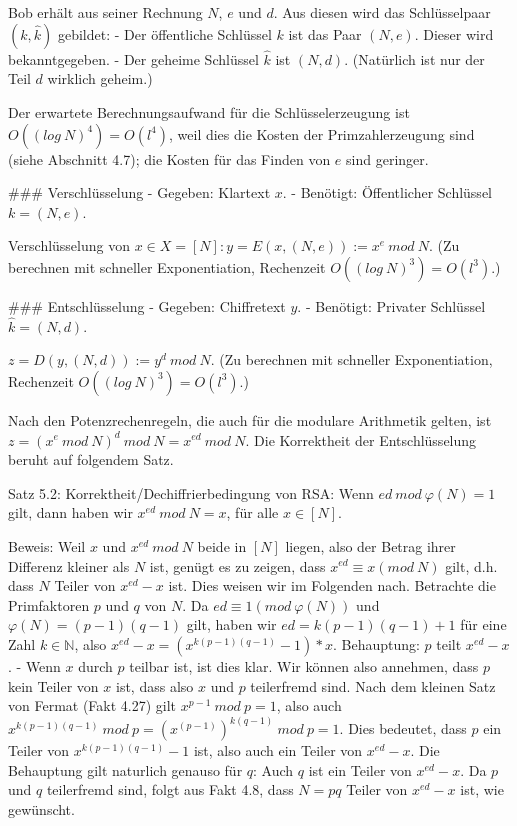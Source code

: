 \documentclass[a4paper]{article}
\begin{document}
\begin{multicols}{3}
{{{Bob erhält aus seiner Rechnung $N$, $e$ und $d$. Aus diesen wird das Schlüsselpaar $(k,\hat{k})$ gebildet:
- Der öffentliche Schlüssel $k$ ist das Paar $(N,e)$. Dieser wird bekanntgegeben.
- Der geheime Schlüssel $\hat{k}$ ist $(N,d)$. (Natürlich ist nur der Teil $d$ wirklich geheim.)

Der erwartete Berechnungsaufwand für die Schlüsselerzeugung ist $O((log\ N)^4) =O(l^4)$, weil dies die Kosten der Primzahlerzeugung sind (siehe Abschnitt 4.7); die Kosten für das Finden von $e$ sind geringer.

### Verschlüsselung
- Gegeben: Klartext $x$. 
- Benötigt: Öffentlicher Schlüssel $k= (N,e)$.

Verschlüsselung von $x\in X= [N]: y=E(x,(N,e)) :=x^e\ mod\ N$. (Zu berechnen mit schneller Exponentiation, Rechenzeit $O((log\ N)^3) =O(l^3)$.)

### Entschlüsselung
- Gegeben: Chiffretext $y$. 
- Benötigt: Privater Schlüssel $\hat{k}= (N,d)$.

$z=D(y,(N,d)) :=y^d\ mod\ N$. (Zu berechnen mit schneller Exponentiation, Rechenzeit $O((log\ N)^3) =O(l^3)$.)

Nach den Potenzrechenregeln, die auch für die modulare Arithmetik gelten, ist $z=(x^e\ mod\ N)^d\ mod\ N=x^{ed}\ mod\ N$. Die Korrektheit der Entschlüsselung beruht auf folgendem Satz.

Satz 5.2: Korrektheit/Dechiffrierbedingung von RSA: Wenn $ed\ mod\ \varphi(N) = 1$ gilt, dann haben wir $x^{ed}\ mod\ N=x$, für alle $x\in [N]$.

Beweis: Weil $x$ und $x^{ed}\ mod\ N$ beide in $[N]$ liegen, also der Betrag ihrer Differenz kleiner als $N$ ist, genügt es zu zeigen, dass $x^{ed} \equiv x(mod\ N)$ gilt, d.h. dass $N$ Teiler von $x^{ed}-x$ ist.
Dies weisen wir im Folgenden nach. Betrachte die Primfaktoren $p$ und $q$ von $N$. Da $ed\equiv 1 (mod\ \varphi(N))$ und $\varphi(N) = (p-1)(q-1)$ gilt, haben wir $ed=k(p-1)(q-1) + 1$ für eine Zahl $k\in\mathbb{N}$, also $x^{ed}-x= (x^{k(p-1)(q-1)} -1)*x$.
Behauptung: $p$ teilt $x^{ed}-x$. - Wenn $x$ durch $p$ teilbar ist, ist dies klar. Wir können also annehmen, dass $p$ kein Teiler von $x$ ist, dass also $x$ und $p$ teilerfremd sind. Nach dem kleinen Satz von Fermat (Fakt 4.27) gilt $x^{p-1}\ mod\ p= 1$, also auch $x^{k(p-1)(q-1)}\ mod\ p= (x^{(p-1)})^{k(q-1)}\ mod\ p= 1$.
Dies bedeutet, dass $p$ ein Teiler von $x^{k(p-1)(q-1)}-1$ ist, also auch ein Teiler von $x^{ed}-x$.
Die Behauptung gilt naturlich genauso für $q$: Auch $q$ ist ein Teiler von $x^{ed}-x$. Da $p$ und $q$ teilerfremd sind, folgt aus Fakt 4.8, dass $N=pq$ Teiler von $x^{ed}-x$ ist, wie gewünscht.

}}}
\end{multicols}
\end{document}
